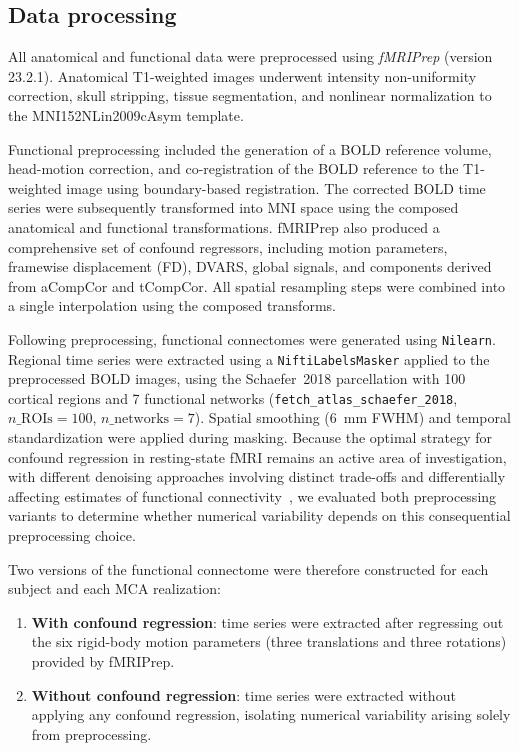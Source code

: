 \subsection{Data processing}
All anatomical and functional data were preprocessed using \textit{fMRIPrep} (version 23.2.1). Anatomical T1-weighted images underwent intensity non-uniformity correction, skull stripping, tissue segmentation, and nonlinear normalization to the MNI152NLin2009cAsym template.

Functional preprocessing included the generation of a BOLD reference volume, head-motion correction, and co-registration of the BOLD reference to the T1-weighted image using boundary-based registration. The corrected BOLD time series were subsequently transformed into MNI space using the composed anatomical and functional transformations. fMRIPrep also produced a comprehensive set of confound regressors, including motion parameters, framewise displacement (FD), DVARS, global signals, and components derived from aCompCor and tCompCor. All spatial resampling steps were combined into a single interpolation using the composed transforms. 

Following preprocessing, functional connectomes were generated using \texttt{Nilearn}. Regional time series were extracted using a \texttt{NiftiLabelsMasker} applied to the preprocessed BOLD images, using the Schaefer~2018 parcellation with 100 cortical regions and 7 functional networks (\texttt{fetch\_atlas\_schaefer\_2018}, $n\_{\text{ROIs}}=100$, $n\_{\text{networks}}=7$). Spatial smoothing (6~mm FWHM) and temporal standardization were applied during masking. Because the optimal strategy for confound regression in resting-state fMRI remains an active area of investigation, with different denoising approaches involving distinct trade-offs and differentially affecting estimates of functional connectivity~\cite{Power2012,Ciric2017,Parkes2018,Murphy2017}, we evaluated both preprocessing variants to determine whether numerical variability depends on this consequential preprocessing choice.

Two versions of the functional connectome were therefore constructed for each subject and each MCA realization:
\begin{enumerate}
    \item \textbf{With confound regression}: time series were extracted after regressing out the six rigid-body motion parameters (three translations and three rotations) provided by fMRIPrep.
    \item \textbf{Without confound regression}: time series were extracted without applying any confound regression, isolating numerical variability arising solely from preprocessing.
\end{enumerate}

